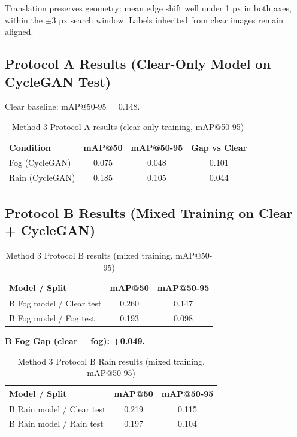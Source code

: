 \documentclass[11pt,a4paper]{article}
\begin{document}
Translation preserves geometry: mean edge shift well under 1 px in both axes, within the $\pm3$ px search window. Labels inherited from clear images remain aligned.

\subsection{Protocol A Results (Clear-Only Model on CycleGAN Test)}

Clear baseline: mAP@50-95 = 0.148.

\begin{table}[H]
\centering
\caption{Method 3 Protocol A results (clear-only training, mAP@50-95)}
\label{tab:method3_3a_results}
\begin{tabular}{lccc}
\toprule
Condition & mAP@50 & mAP@50-95 & Gap vs Clear \\
\midrule
Fog (CycleGAN) & 0.075 & 0.048 & 0.101 \\
Rain (CycleGAN) & 0.185 & 0.105 & 0.044 \\
\bottomrule
\end{tabular}
\end{table}

\subsection{Protocol B Results (Mixed Training on Clear + CycleGAN)}

\begin{table}[H]
\centering
\caption{Method 3 Protocol B results (mixed training, mAP@50-95)}
\label{tab:method3_3b_results}
\begin{tabular}{lcc}
\toprule
Model / Split & mAP@50 & mAP@50-95 \\
\midrule
B Fog model / Clear test & 0.260 & 0.147 \\
B Fog model / Fog test & 0.193 & 0.098 \\
\bottomrule
\end{tabular}
\end{table}

\textbf{B Fog Gap (clear $-$ fog): +0.049.}

\begin{table}[H]
\centering
\caption{Method 3 Protocol B Rain results (mixed training, mAP@50-95)}
\label{tab:method3_3b_rain_results}
\begin{tabular}{lcc}
\toprule
Model / Split & mAP@50 & mAP@50-95 \\
\midrule
B Rain model / Clear test & 0.219 & 0.115 \\
B Rain model / Rain test & 0.197 & 0.104 \\
\bottomrule
\end{tabular}
\end{table}
\end{document}
